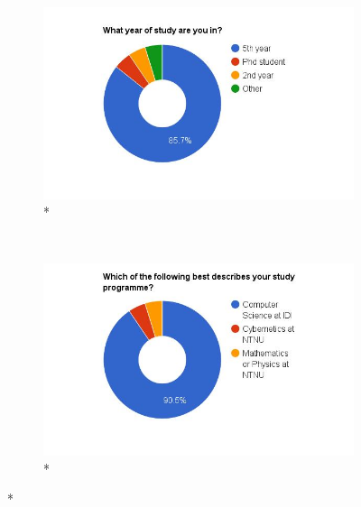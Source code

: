 \begin{figure}
    \centering
    \begin{subfigure}[h]{0.45\textwidth}
        \centerline{\includegraphics[width=1.5\textwidth]{results/year_of_study.jpg}}
        \caption{*}
        \label{fig:year-of-study}
    \end{subfigure}
    ~ %
    \hfill
    \begin{subfigure}[h]{0.45\textwidth}
        \centerline{\includegraphics[width=1.5\textwidth]{results/study_programme.jpg}}
        \caption{*}
        \label{fig:study-programme}
    \end{subfigure}


\end{figure}
